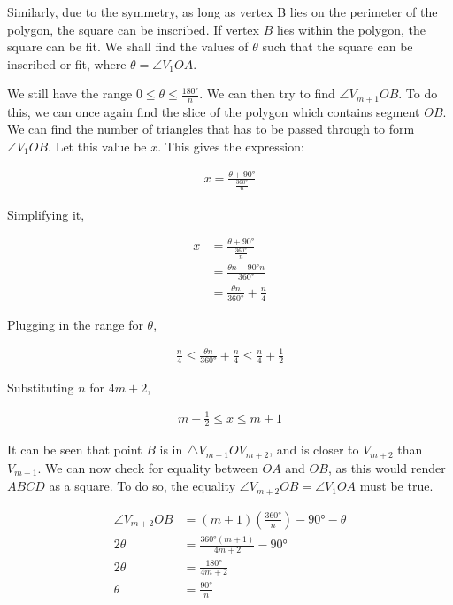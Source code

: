 \documentclass[12pt]{scrartcl}
\begin{document}
Similarly, due to the symmetry, as long as vertex B lies on the perimeter of the polygon, the square can be inscribed.
If vertex $B$ lies within the polygon, the square can be fit. We shall find the values of $\theta$ such that the square can be inscribed or fit,
where $\theta = \angle V_{1}OA$.

We still have the range $0 \leq \theta \leq \frac{\ang{180}}{n}$.
We can then try to find $\angle V_{m+1}OB$. To do this, we can once again find the slice of the polygon which contains segment $OB$. We can find the number of triangles that has to be passed through to form $\angle V_{1}OB$. Let this value be $x$. This gives the expression:

\begin{align*}
	 x = \frac{\theta + \ang{90}}{\frac{\ang{360}}{n}}
\end{align*}

Simplifying it,

\begin{align*}
	 x & = \frac{\theta + \ang{90}}{\frac{\ang{360}}{n}}   \\
	 & = \frac{\theta n + \ang{90} n}{\ang{360}} \\
	 & = \frac{\theta n}{\ang{360}} + \frac{n}{4}
\end{align*}

Plugging in the range for $\theta$,

\begin{align*}
	\frac{n}{4} \leq \frac{\theta n}{\ang{360}} + \frac{n}{4} \leq \frac{n}{4} + \frac{1}{2}
\end{align*}

Substituting $n$ for $4m + 2$, 

\begin{align*}
	m + \frac{1}{2} \leq x \leq m + 1
\end{align*}

It can be seen that point $B$ is in $\triangle V_{m+1}OV_{m+2}$, and is closer to $V_{m+2}$ than $V_{m+1}$.
We can now check for equality between $OA$ and $OB$, as this would render $ABCD$ as a square.
To do so, the equality $\angle V_{m+2}OB = \angle V_{1}OA$ must be true.

\begin{align*}
	\angle V_{m+2}OB & = \left(m+1\right)\left(\frac{\ang{360}}{n}\right) - \ang{90} - \theta \\
	2\theta & = \frac{\ang{360}\left(m+1\right)}{4m+2} - \ang{90}   \\
	2\theta & = \frac{\ang{180}}{4m+2}    \\
	\theta & = \frac{\ang{90}}{n}
\end{align*}
\end{document}
